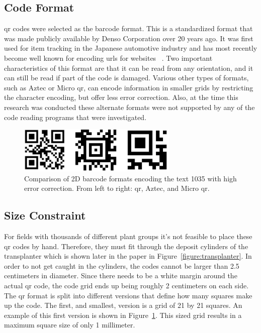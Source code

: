 \subsection{Code Format}
\label{section:code_format}

\acf{qr} codes were selected as the barcode format. This is a standardized format that was made publicly available by Denso Corporation over 20 years ago.  It was first used for item tracking in the Japanese automotive industry and has most recently become well known for encoding \acp{url} for websites ~\citep{Denso:2014}. Two important characteristics of this format are that it can be read from any orientation, and it can still be read if part of the code is damaged.  Various other types of formats, such as Aztec or Micro \ac{qr}, can encode information in smaller grids by restricting the character encoding, but offer less error correction.  Also, at the time this research was conducted these alternate formats were not supported by any of the code reading programs that were investigated. 

\begin{figure}
	\centering
    \includegraphics[width=3in]{figures/generated_codes_1035.jpg}
    \caption[2D barcode formats]{Comparison of 2D barcode formats encoding the text 1035 with high error correction.  From left to right: \acf{qr}, Aztec, and Micro \ac{qr}.}
    \label{barcode_formats}
\end{figure} 

\subsection{Size Constraint}

For fields with thousands of different plant groups it's not feasible to place these \ac{qr} codes by hand.  Therefore, they must fit through the deposit cylinders of the transplanter which is shown later in the paper in Figure~\ref{figure:transplanter}.  In order to not get caught in the cylinders, the codes cannot be larger than 2.5 centimeters in diameter. Since there needs to be a white margin around the actual \ac{qr} code, the code grid ends up being roughly 2 centimeters on each side.  The \ac{qr} format is split into different versions that define how many squares make up the code.  The first, and smallest, version is a grid of 21 by 21 squares.  An example of this first version is shown in Figure~\ref{barcode_formats}.  This sized grid results in a maximum square size of only 1 millimeter.  

